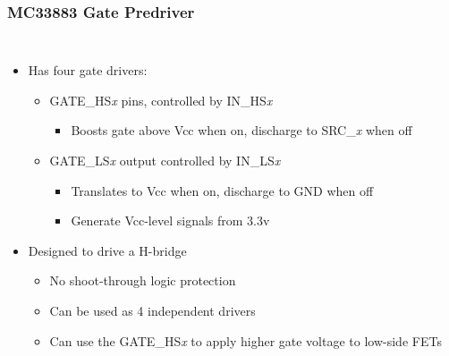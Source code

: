 \documentclass{beamer}
\begin{document}
\begin{frame}
\frametitle{MC33883 Gate Predriver}
\begin{columns}[t]
\begin{itemize}
  \item Has four gate drivers:
  \begin{itemize}
    \item GATE\_HS\textit{x} pins, controlled by IN\_HS\textit{x}
    \begin{itemize}
      \item Boosts gate above Vcc when on, discharge to SRC\_\textit{x} when off
    \end{itemize}
    \item GATE\_LS\textit{x} output controlled by IN\_LS\textit{x} \\
    \begin{itemize}
      \item Translates to Vcc when on, discharge to GND when off
      \item Generate Vcc-level signals from 3.3v
    \end{itemize}
  \end{itemize}
  \item Designed to drive a H-bridge
  \begin{itemize}
    \item No shoot-through logic protection
    \item Can be used as 4 independent drivers
    \item Can use the GATE\_HS\textit{x} to apply higher gate voltage to low-side FETs
  \end{itemize}
\end{itemize}


\end{columns}
\end{frame}
\end{document}
